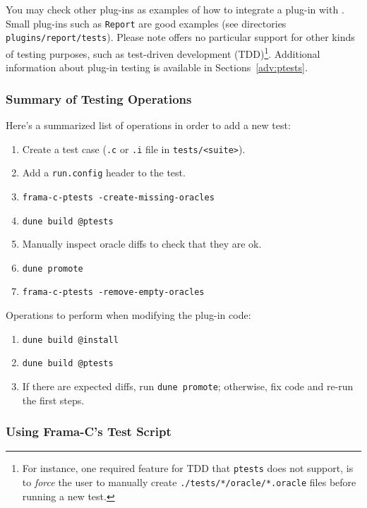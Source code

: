 You may check other \framac plug-ins as examples of how to integrate a
plug-in with \ptests. Small plug-ins such as \texttt{Report} are good examples
(see directories \texttt{plugins/report/tests}).
Please note \framac offers no particular support for other kinds of testing
purposes, such as test-driven development (TDD)\footnote{For instance, one
required feature for TDD that \texttt{ptests} does not support, is to
{\em force} the user to manually create \texttt{./tests/*/oracle/*.oracle}
files before running a new test.}.
Additional information about plug-in testing is available in
Sections~\ref{adv:ptests}.

\subsubsection{Summary of Testing Operations}

Here's a summarized list of operations in order to add a new test:

\begin{enumerate}
\item Create a test case (\texttt{.c} or \texttt{.i} file in
  \texttt{tests/<suite>}).
\item Add a \texttt{run.config} header to the test.
\item \verb|frama-c-ptests -create-missing-oracles|
\item \verb|dune build @ptests|
\item Manually inspect oracle diffs to check that they are ok.
\item \verb|dune promote|
\item \verb|frama-c-ptests -remove-empty-oracles|
\end{enumerate}

Operations to perform when modifying the plug-in code:

\begin{enumerate}
\item \verb|dune build @install|
\item \verb|dune build @ptests|
\item If there are expected diffs, run \verb|dune promote|;
  otherwise, fix code and re-run the first steps.
\end{enumerate}

\subsubsection{Using Frama-C's Test Script}

